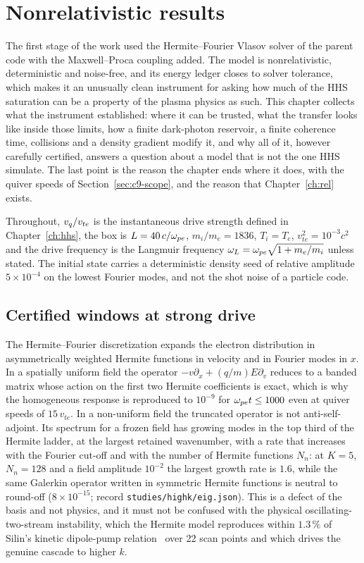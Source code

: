 \chapter{Nonrelativistic results}\label{ch:nonrel}

The first stage of the work used the Hermite--Fourier Vlasov solver of the parent code with the Maxwell--Proca coupling added. The model is nonrelativistic, deterministic and noise-free, and its energy ledger closes to solver tolerance, which makes it an unusually clean instrument for asking how much of the HHS saturation can be a property of the plasma physics as such. This chapter collects what the instrument established: where it can be trusted, what the transfer looks like inside those limits, how a finite dark-photon reservoir, a finite coherence time, collisions and a density gradient modify it, and why all of it, however carefully certified, answers a question about a model that is not the one HHS simulate. The last point is the reason the chapter ends where it does, with the quiver speeds of Section~\ref{sec:c9-scope}, and the reason that Chapter~\ref{ch:rel} exists.

Throughout, $v_q/v_{te}$ is the instantaneous drive strength defined in Chapter~\ref{ch:hhs}, the box is $L=40\,c/\omega_{pe}$, $m_i/m_e=1836$, $T_i=T_e$, $v_{te}^2=10^{-3}c^2$ and the drive frequency is the Langmuir frequency $\omega_L=\omega_{pe}\sqrt{1+m_e/m_i}$ unless stated. The initial state carries a deterministic density seed of relative amplitude $5\times10^{-4}$ on the lowest Fourier modes, and not the shot noise of a particle code.

\section{Certified windows at strong drive}\label{sec:c9-windows}


The Hermite--Fourier discretization expands the electron distribution in asymmetrically weighted Hermite functions in velocity and in Fourier modes in $x$. In a spatially uniform field the operator $-v\partial_x+(q/m)E\partial_v$ reduces to a banded matrix whose action on the first two Hermite coefficients is exact, which is why the homogeneous response is reproduced to $10^{-9}$ for $\omega_{pe} t\le1000$ even at quiver speeds of $15\,v_{te}$. In a non-uniform field the truncated operator is not anti-self-adjoint. Its spectrum for a frozen field has growing modes in the top third of the Hermite ladder, at the largest retained wavenumber, with a rate that increases with the Fourier cut-off and with the number of Hermite functions $N_n$: at $K=5$, $N_n=128$ and a field amplitude $10^{-2}$ the largest growth rate is $1.6$, while the same Galerkin operator written in symmetric Hermite functions is neutral to round-off ($8\times10^{-15}$; record \texttt{studies/highk/eig.json}). This is a defect of the basis and not physics, and it must not be confused with the physical oscillating-two-stream instability, which the Hermite model reproduces within $1.3\,\%$ of Silin's kinetic dipole-pump relation~\cite{Silin1965} over 22 scan points and which drives the genuine cascade to higher $k$.

